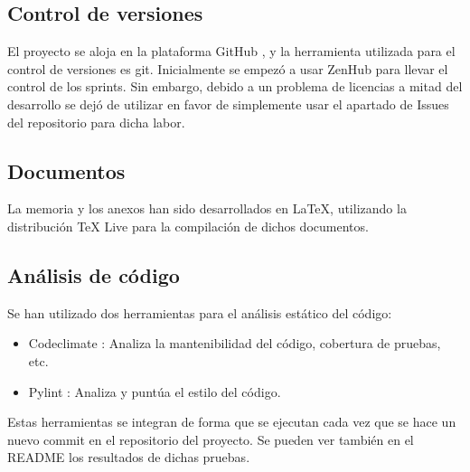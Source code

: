 \subsection{Control de versiones}

El proyecto se aloja en la plataforma GitHub \cite{github}, y la herramienta utilizada para el control de versiones es git.
Inicialmente se empezó a usar ZenHub \cite{zenhub} para llevar el control de los sprints. Sin embargo, debido a un problema de 
licencias a mitad del desarrollo se dejó de utilizar en favor de simplemente usar el apartado de Issues del repositorio 
para dicha labor.

\subsection{Documentos}

La memoria y los anexos han sido desarrollados en LaTeX, utilizando la distribución TeX Live\cite{texlive} para la
compilación de dichos documentos.

\subsection{Análisis de código}

Se han utilizado dos herramientas para el análisis estático del código:
\begin{itemize}
    \item Codeclimate \cite{codeclimate}: Analiza la mantenibilidad del código, cobertura de pruebas, etc.
    \item Pylint \cite{pylint}: Analiza y puntúa el estilo del código.
\end{itemize}

Estas herramientas se integran de forma que se ejecutan cada vez que se hace un nuevo commit en el repositorio del proyecto.
Se pueden ver también en el README los resultados de dichas pruebas.